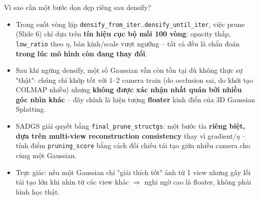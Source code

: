 
\begin{frame}{Vì sao cần một bước dọn dẹp riêng sau densify?}
\footnotesize
\begin{itemize}
    \item Trong suốt vòng lặp \texttt{densify\_from\_iter}..\texttt{densify\_until\_iter}, việc prune (Slide 6) chỉ dựa trên \textbf{tín hiệu cục bộ mỗi 100 vòng}: opacity thấp, \texttt{low\_ratio} theo $\eta$, bán kính/scale vượt ngưỡng -- tất cả đều là chẩn đoán \textbf{trong lúc mô hình còn đang thay đổi}.
    \item Sau khi ngừng densify, một số Gaussian vẫn còn tồn tại dù không thực sự "thật": chúng chỉ khớp tốt với 1--2 camera train (do occlusion sai, do khởi tạo COLMAP nhiễu) nhưng \textbf{không được xác nhận nhất quán bởi nhiều góc nhìn khác} -- đây chính là hiện tượng \textbf{floater} kinh điển của 3D Gaussian Splatting.
    \item SADGS giải quyết bằng \texttt{final\_prune\_structgs}: một bước tỉa \textbf{riêng biệt, dựa trên multi-view reconstruction consistency} thay vì gradient/$\eta$ -- tính điểm \texttt{pruning\_score} bằng cách đối chiếu tái tạo giữa nhiều camera cho cùng một Gaussian.
    \item Trực giác: nếu một Gaussian chỉ "giải thích tốt" ảnh từ 1 view nhưng gây lỗi tái tạo lớn khi nhìn từ các view khác $\Rightarrow$ nghi ngờ cao là floater, không phải hình học thật.
\end{itemize}
\end{frame}

